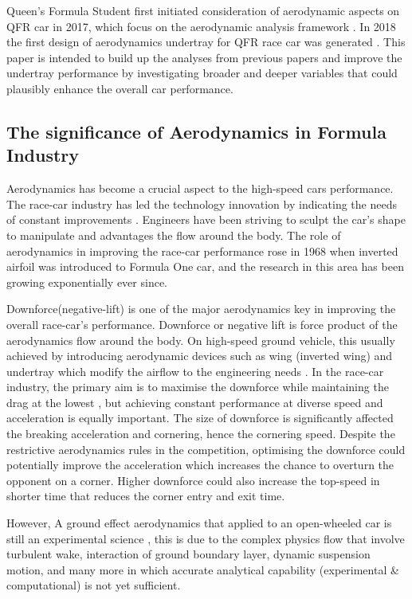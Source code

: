 \noindent Queen's Formula Student first initiated consideration of aerodynamic aspects on QFR car in 2017, which focus on the aerodynamic analysis framework \cite{Corr2017MechanicalAuthor}. In 2018 the first design of aerodynamics undertray for QFR race car was generated \cite{McKeown2018DesignCar}. This paper is intended to build up the analyses from previous papers and improve the undertray performance by investigating broader and deeper variables that could plausibly enhance the overall car performance. 

\subsection{The significance of Aerodynamics in Formula Industry}
Aerodynamics has become a crucial aspect to the high-speed cars performance. The race-car industry has led the technology innovation by indicating the needs of constant improvements \cite{Zhang2006GroundCars}. Engineers have been striving to sculpt the car's shape to manipulate and advantages the flow around the body. The role of aerodynamics in improving the race-car performance rose in 1968 when inverted airfoil was introduced to Formula One car, and the research in this area has been growing exponentially ever since. 


\noindent Downforce(negative-lift) is one of the major aerodynamics key in improving the overall race-car's performance. Downforce or negative lift is force product of the aerodynamics flow around the body. On high-speed ground vehicle, this usually achieved by introducing aerodynamic devices such as wing (inverted wing) and undertray which modify the airflow to the engineering needs \cite{Wright1982TheCars}. In the race-car industry, the primary aim is to maximise the downforce while maintaining the drag at the lowest \cite{Zhang2006GroundCars}, but achieving constant performance at diverse speed and acceleration is equally important.  The size of downforce is significantly affected the breaking acceleration and cornering, hence the cornering speed. Despite the restrictive aerodynamics rules in the competition, optimising the downforce could potentially improve the acceleration which increases the chance to overturn the opponent on a corner. Higher downforce could also increase the top-speed in shorter time that reduces the corner entry and exit time. 

\noindent However, A ground effect aerodynamics that applied to an open-wheeled car is still an experimental science \cite{Zhang2006GroundCars}, this is due to the complex physics flow that involve turbulent wake, interaction of ground boundary layer, dynamic suspension motion, and many more in which accurate analytical capability (experimental \& computational) is not yet sufficient.

